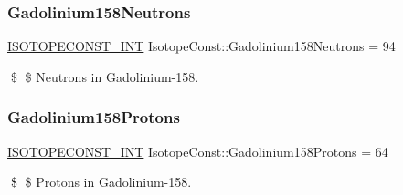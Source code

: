 \subsubsection{\texorpdfstring{Gadolinium158\+Neutrons}{Gadolinium158Neutrons}}
{\footnotesize\ttfamily \mbox{\hyperlink{group___isotope_const-_macros_ga5f18360b3e99483a35c32d789e62621c}{I\+S\+O\+T\+O\+P\+E\+C\+O\+N\+S\+T\+\_\+\+I\+NT}} Isotope\+Const\+::\+Gadolinium158\+Neutrons = 94}

\$ \$ Neutrons in Gadolinium-\/158. \mbox{\label{group___isotope_const-_gadolinium-_gd158_gaa09da307b8b6f53a686780274d48d94a}} 
\subsubsection{\texorpdfstring{Gadolinium158\+Protons}{Gadolinium158Protons}}
{\footnotesize\ttfamily \mbox{\hyperlink{group___isotope_const-_macros_ga5f18360b3e99483a35c32d789e62621c}{I\+S\+O\+T\+O\+P\+E\+C\+O\+N\+S\+T\+\_\+\+I\+NT}} Isotope\+Const\+::\+Gadolinium158\+Protons = 64}

\$ \$ Protons in Gadolinium-\/158. 